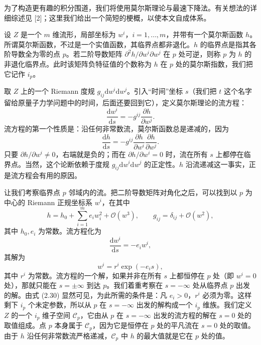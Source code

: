 \documentclass[11pt,a4paper,UTF8]{ctexart}
\theoremstyle{plain}
\theoremstyle{definition}
\begin{document}
为了构造更有趣的积分围道，我们将使用莫尔斯理论与最速下降法。有关想法的详细综述见 [2]；这里我们给出一个简短的梗概，以使本文自成体系。

设 $Z$ 是一个 $m$ 维流形，局部坐标为 $w^i$，$i=1,\dots,m$，并带有一个莫尔斯函数 $h$。所谓莫尔斯函数，不过是一个实值函数，其临界点都非退化。$h$ 的临界点是指其各阶导数全为零的点 $p$。若二阶导数矩阵 $\partial^2h/\partial w^i\partial w^j$ 在 $p$ 处可逆，则称 $p$ 为 $h$ 的非退化临界点。此时该矩阵负特征值的个数称为 $h$ 在 $p$ 处的莫尔斯指数，我们把它记作 $i_p$。

取 $Z$ 上的一个 Riemann 度规 $g_{ij}\mathrm{d}w^i\mathrm{d}w^j$。引入“时间”坐标 $s$（我们把 $t$ 这个名字留给原量子力学问题中的时间，后面还要回到它），定义莫尔斯理论的流方程：
\begin{equation}
    \frac{\mathrm{d}w^i}{\mathrm{d}s}=-g^{ij}\frac{\partial h}{\partial w^j}.
    \tag{2.27}
\end{equation}
流方程的第一个性质是：沿任何非常数流，莫尔斯函数总是递减的，因为
\begin{equation}
    \frac{\mathrm{d}h}{\mathrm{d}s}
    =-g^{ij}\frac{\partial h}{\partial w^i}\frac{\partial h}{\partial w^j}.
    \tag{2.28}
\end{equation}
只要 $\partial h/\partial w^i\neq0$，右端就是负的；而在 $\partial h/\partial w^i=0$ 时，流在所有 $s$ 上都停在临界点。当然，这个论断依赖于度规 $g_{ij}\mathrm{d}w^i\mathrm{d}w^j$ 的正定性。$h$ 沿流递减这一事实，正是流方程会有用的原因。


让我们考察临界点 $p$ 邻域内的流。把二阶导数矩阵对角化之后，可以找到以 $p$ 为中心的 Riemann 正规坐标系 $w^i$，在其中
\[
    h=h_0+\sum_{i=1}^{m}e_i w_i^2+\mathcal O(w^3),
    \qquad g_{ij}=\delta_{ij}+\mathcal O(w^2),
\]
其中 $h_0,e_i$ 为常数。流方程化为
\begin{equation}
    \frac{\mathrm{d}w^i}{\mathrm{d}s}=-e_i w^i,
    \tag{2.29}
\end{equation}
其解为
\begin{equation}
    w^i=r^i\exp(-e_i s),
    \tag{2.30}
\end{equation}
其中 $r^i$ 为常数。流方程的一个解，如果并非在所有 $s$ 上都恒停在 $p$ 处（即 $w^i=0$ 处），那就只能在 $s=\pm\infty$ 到达 $p$。我们着重考察在 $s=-\infty$ 处从临界点 $p$ 出发的解。由式 (2.30) 显然可见，为此所需的条件是：凡 $e_i>0$，$r^i$ 必须为零。这样剩下 $i_p$ 个未定参数，所以从 $p$ 在 $s=-\infty$ 出发的解构成一个 $i_p$ 维族。我们定义 $Z$ 的一个 $i_p$ 维子空间 $\mathcal C_p$，它由从 $p$ 在 $s=-\infty$ 出发的流方程的解在 $s=0$ 处的取值组成。点 $p$ 本身属于 $\mathcal C_p$，因为它是恒停在 $p$ 处的平凡流在 $s=0$ 处的取值。由于 $h$ 沿任何非常数流严格递减，$\mathcal C_p$ 中 $h$ 的最大值就是它在 $p$ 处的值。
\end{document}

